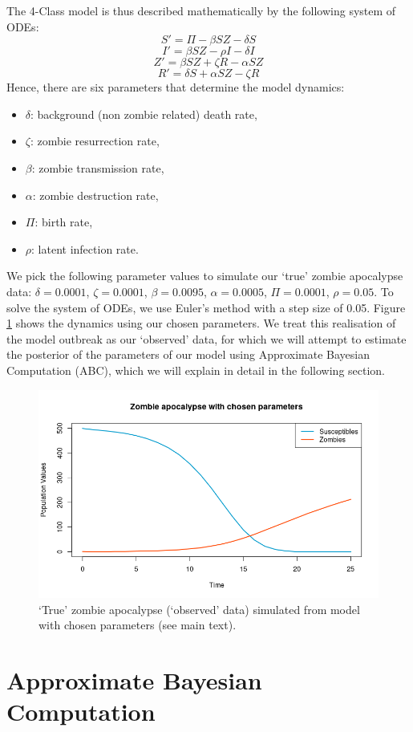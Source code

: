 \documentclass[]{article}
\begin{document}
The 4-Class model is thus described mathematically by the following system of ODEs:
\[S' = \Pi - \beta SZ - \delta S\]
\[I' = \beta SZ - \rho I - \delta I\]
\[Z' = \beta SZ + \zeta R - \alpha SZ\]
\[R' = \delta S + \alpha SZ - \zeta R\]
Hence, there are six parameters that determine the model dynamics: 
\begin{itemize}
	\item $\delta$: background (non zombie related) death rate,
	\item $\zeta$: zombie resurrection rate,
	\item $\beta$: zombie transmission rate,
	\item $\alpha$: zombie destruction rate,
	\item $\Pi$: birth rate,
	\item $\rho$: latent infection rate.
\end{itemize}

We pick the following parameter values to simulate our `true' zombie apocalypse data: $\delta=0.0001$, $\zeta= 0.0001$, $\beta=0.0095$, $\alpha=0.0005$, $\Pi=0.0001$, $\rho=0.05$. To solve the system of ODEs, we use Euler's method with a step size of 0.05. Figure \ref{true_epidemic} shows the dynamics using our chosen parameters. We treat this realisation of the model outbreak as our `observed' data, for which we will attempt to estimate the posterior of the parameters of our model using Approximate Bayesian Computation (ABC), which we will explain in detail in the following section.

\begin{figure}[H]
	\centering
	\includegraphics[width=0.8\linewidth]{../Figures/true_epidemic}
	\caption{`True' zombie apocalypse (`observed' data) simulated from model with chosen parameters (see main text).}
	\label{true_epidemic}
\end{figure}

\section{Approximate Bayesian Computation}
\end{document}
